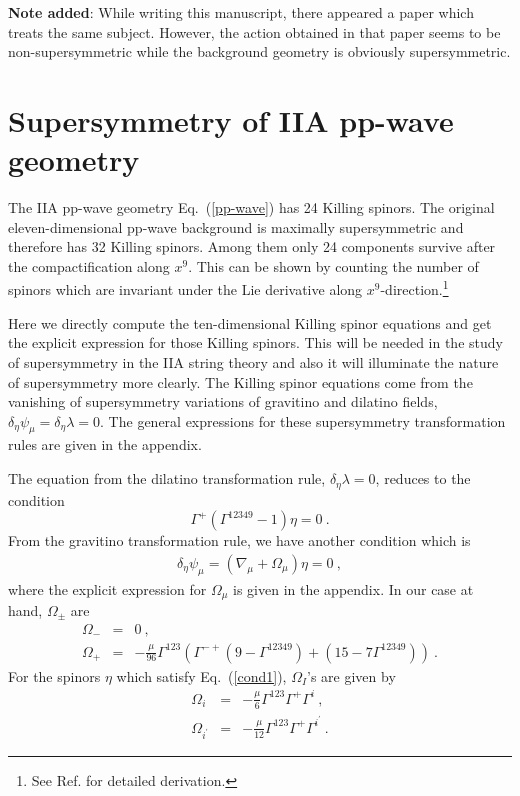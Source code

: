 \documentclass[a4paper,12pt]{article}
\begin{document}
{\bf Note added}: While writing this manuscript, there appeared a
paper \cite{sug029} which treats the same subject. However, the action
obtained in that paper seems to be non-supersymmetric while the
background geometry is obviously supersymmetric.





\section{Supersymmetry of IIA pp-wave geometry}

The IIA pp-wave geometry Eq.~(\ref{pp-wave}) has 24 Killing spinors.
The original eleven-dimensional pp-wave background is maximally
supersymmetric and therefore has 32 Killing spinors.  Among them only
24 components survive after the compactification along $x^9$. This can
be shown by counting the number of spinors which are invariant under
the Lie derivative along $x^9$-direction.\footnote{See
Ref. \cite{mic140} for detailed derivation.}

Here we directly compute the ten-dimensional Killing spinor equations
and get the explicit expression for those Killing spinors. This will
be needed in the study of supersymmetry in the IIA string theory and
also it will illuminate the nature of supersymmetry more clearly.  The
Killing spinor equations come from the vanishing of supersymmetry
variations of gravitino and dilatino fields,
$\delta_\eta\psi_\mu=\delta_\eta\lambda=0$. The general expressions for these
supersymmetry transformation rules are given in the appendix.

The equation from the dilatino transformation rule, $\delta_\eta\lambda=0$, 
reduces to the condition
\begin{equation}
\Gamma^+(\Gamma^{12349}-1)\eta =0~.
\label{cond1}
\end{equation} 
From the gravitino transformation rule, we have another condition
which is
\begin{eqnarray}
\delta_\eta \psi_\mu =  (\nabla_\mu + \Omega_\mu ) \eta = 0~,  
\label{cond2}
\end{eqnarray} 
where the explicit expression for $\Omega_\mu$ is given in the appendix. 
In our case at hand, $\Omega_{\pm}$ are 
\begin{eqnarray}
\Omega_- &=& 0~, \nonumber \\
\Omega_{+} &=&-
\frac{\mu}{96}\Gamma^{123}\left(\Gamma^{-+}(9-\Gamma^{12349}) +
  (15-7\Gamma^{12349})\right)~.  
\end{eqnarray}  
For the spinors $\eta$ which satisfy Eq.~(\ref{cond1}), $\Omega_I$'s
are given by
\begin{eqnarray}
\Omega_i &=& -\frac{\mu}{6}\Gamma^{123}\Gamma^+\Gamma^i~, 
                                        \nonumber \\
\Omega_{i^\prime} &=&
-\frac{\mu}{12}\Gamma^{123}\Gamma^+\Gamma^{i^\prime}~.
\label{omegaI}
\end{eqnarray}  
\end{document}
